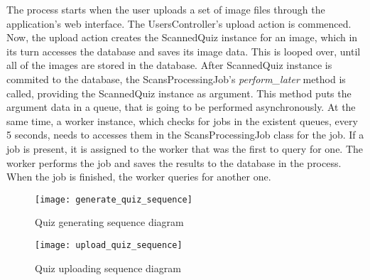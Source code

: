 The process starts when the user uploads a set of image files through the application's web interface. The UsersController's upload action is commenced. Now, the upload action creates the ScannedQuiz instance for an image, which in its turn accesses the database and saves its image data. This is looped over, until all of the images are stored in the database. After ScannedQuiz instance is commited to the database, the ScansProcessingJob's \textit{perform\_later} method is called, providing the ScannedQuiz instance as argument. This method puts the argument data in a queue, that is going to be performed asynchronously. At the same time, a worker instance, which checks for jobs in the existent queues, every 5 seconds, needs to accesses them in the ScansProcessingJob class for the job. If a job is present, it is assigned to the worker that was the first to query for one. The worker performs the job and saves the results to the database in the process. When the job is finished, the worker queries for another one.


\begin{sidewaysfigure}[!ht]
\centering
\texttt{[image: generate\_quiz\_sequence]}
\caption{Quiz generating sequence diagram}\label{generate_sequence}
\end{sidewaysfigure}

\begin{sidewaysfigure}[!ht]
\centering
\texttt{[image: upload\_quiz\_sequence]}
\caption{Quiz uploading sequence diagram}\label{upload_sequence}
\end{sidewaysfigure}







